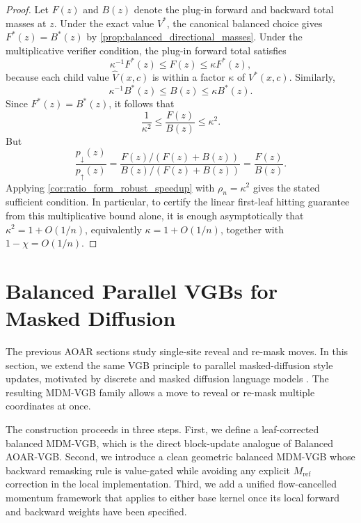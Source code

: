\documentclass{article}
\numberwithin{theorem}{section}
\numberwithin{proposition}{section}
\numberwithin{corollary}{section}
\numberwithin{lemma}{section}
\numberwithin{conjecture}{section}
\numberwithin{remark}{section}
\numberwithin{definition}{section}
\numberwithin{assumption}{section}
\numberwithin{example}{section}
\begin{document}
\begin{proof}
Let $F(z)$ and $B(z)$ denote the plug-in forward and backward total masses at $z$. Under the exact value $V^*$, the canonical balanced choice gives $F^*(z)=B^*(z)$ by \cref{prop:balanced_directional_masses}. Under the multiplicative verifier condition, the plug-in forward total satisfies
\begin{equation*}
    \kappa^{-1}F^*(z)\le F(z)\le \kappa F^*(z),
\end{equation*}
because each child value $\widehat V(x,c)$ is within a factor $\kappa$ of $V^*(x,c)$. Similarly,
\begin{equation*}
    \kappa^{-1}B^*(z)\le B(z)\le \kappa B^*(z).
\end{equation*}
Since $F^*(z)=B^*(z)$, it follows that
\begin{equation*}
    \frac{1}{\kappa^2}\le \frac{F(z)}{B(z)}\le \kappa^2.
\end{equation*}
But
\begin{equation*}
    \frac{p_{\downarrow}(z)}{p_{\uparrow}(z)}
    =
    \frac{F(z)/(F(z)+B(z))}{B(z)/(F(z)+B(z))}
    =
    \frac{F(z)}{B(z)}.
\end{equation*}
Applying \cref{cor:ratio_form_robust_speedup} with $\rho_n=\kappa^2$ gives the stated sufficient condition. In particular, to certify the linear first-leaf hitting guarantee from this multiplicative bound alone, it is enough asymptotically that $\kappa^2=1+O(1/n)$, equivalently $\kappa=1+O(1/n)$, together with $1-\chi=O(1/n)$.
\end{proof}

\section{Balanced Parallel VGBs for Masked Diffusion}
\label{app:sec:balanced_mdm_vgb}

The previous AOAR sections study single-site reveal and re-mask moves. In this section, we extend the same VGB principle to parallel masked-diffusion style updates, motivated by discrete and masked diffusion language models \citep{austin2021structured,sahoo2024simple}. The resulting MDM-VGB family allows a move to reveal or re-mask multiple coordinates at once.

The construction proceeds in three steps. First, we define a leaf-corrected balanced MDM-VGB, which is the direct block-update analogue of Balanced AOAR-VGB. Second, we introduce a clean geometric balanced MDM-VGB whose backward remasking rule is value-gated while avoiding any explicit $M_{\mathrm{ref}}$ correction in the local implementation. Third, we add a unified flow-cancelled momentum framework that applies to either base kernel once its local forward and backward weights have been specified.
\end{document}
